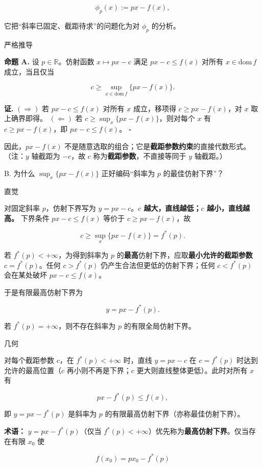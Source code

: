 \documentclass[
    lang=cn,
    color=blue,
    mode=fancy,
    thmcnt=section,
    scheme=chinese
]{elegantbook}
\begin{document}
\[
\phi_p(x) := px - f(x),
\]

它把“斜率已固定、截距待求”的问题化为对 $\phi_p$ 的分析。

严格推导

\textbf{命题 A.} 设 $p \in \mathbb{R}$。仿射函数 $x \mapsto px - c$ 满足 $px - c \le f(x)$ 对所有 $x \in \mathrm{dom}\, f$ 成立，当且仅当

\[
c \ge \sup_{x \in \mathrm{dom}\, f} \bigl\{ px - f(x) \bigr\}.
\]

\textbf{证.}  
$(\Rightarrow)$ 若 $px - c \le f(x)$ 对所有 $x$ 成立，移项得 $c \ge px - f(x)$，对 $x$ 取上确界即得。  
$(\Leftarrow)$ 若 $c \ge \sup_x\{px - f(x)\}$，则对每个 $x$ 有 $c \ge px - f(x)$，即 $px - c \le f(x)$。 $\square$

因此，$px - f(x)$ 不是随意选取的组合；它是\textbf{截距参数约束}的直接代数形式。（注：$y$ 轴截距为 $-c$，故 $c$ 称为\textbf{截距参数}，不直接等同于 $y$ 轴截距。）

\par
B. 为什么 $\sup_x\{px - f(x)\}$ 正好编码“斜率为 $p$ 的最佳仿射下界”？

直觉

对固定斜率 $p$，仿射下界写为 $y = px - c$。\textbf{$c$ 越大，直线越低；$c$ 越小，直线越高。} 下界条件 $px - c \le f(x)$ 等价于 $c \ge px - f(x)$，故

\[
c \ge \sup_x\{px - f(x)\} = f^*(p).
\]

若 $f^*(p) < +\infty$，为得到斜率为 $p$ 的\textbf{最高}仿射下界，应取\textbf{最小允许的截距参数} $c = f^*(p)$。任何 $c > f^*(p)$ 仍产生合法但更低的仿射下界；任何 $c < f^*(p)$ 会在某处破坏 $px - c \le f(x)$。

于是有限最高仿射下界为

\[
y = px - f^*(p).
\]

若 $f^*(p) = +\infty$，则不存在斜率为 $p$ 的有限全局仿射下界。

几何

对每个截距参数 $c$，在 $f^*(p)<+\infty$ 时，直线 $y = px - c$ 在 $c = f^*(p)$ 时达到允许的最高位置（$c$ 再小则不再是下界；$c$ 更大则直线整体更低）。此时对所有 $x$ 有

\[
px - f^*(p) \le f(x),
\]

即 $y = px - f^*(p)$ 是斜率为 $p$ 的有限最高仿射下界（亦称最佳仿射下界）。

\textbf{术语：} $y = px - f^*(p)$（仅当 $f^*(p)<+\infty$）优先称为\textbf{最高仿射下界}。仅当存在有限 $x_0$ 使

\[
f(x_0) = p x_0 - f^*(p)
\]
\end{document}
